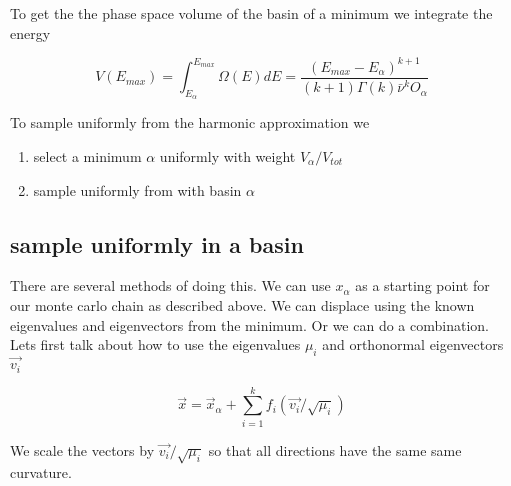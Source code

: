 \documentclass[a4paper]{article}
\begin{document}
To get the the phase space volume of the basin of a minimum we integrate the energy

\begin{equation}
  V(E_{max}) = \int_{E_{\alpha}}^{E_{max}} \Omega(E) dE = \frac{(E_{max} - E_\alpha)^{k+1} }{(k+1)\Gamma(k) \bar{\nu}^k O_\alpha}
\end{equation}

To sample uniformly from the harmonic approximation we

\begin{enumerate}
  \item select a minimum $\alpha$ uniformly with weight $V_{\alpha} / V_{tot}$

  \item sample uniformly from with basin $\alpha$
\end{enumerate}

\subsection{ sample uniformly in a basin}

There are several methods of doing this.  We can use $x_{\alpha}$ as a starting
point for our monte carlo chain as described above.  We can displace using the known
eigenvalues and eigenvectors from the minimum.  Or we can do a combination.  Lets
first talk about how to use the eigenvalues $\mu_i$ and orthonormal eigenvectors $\vec{v_i}$ 

\begin{equation}
  \vec{x} = \vec{x}_{\alpha} + \sum_{i=1}^k f_i (\vec{v_i} / \sqrt{\mu_i})
\end{equation}

We scale the vectors by $\vec{v_i} / \sqrt{\mu_i}$ so that all directions have
the same same curvature.



\end{document}

